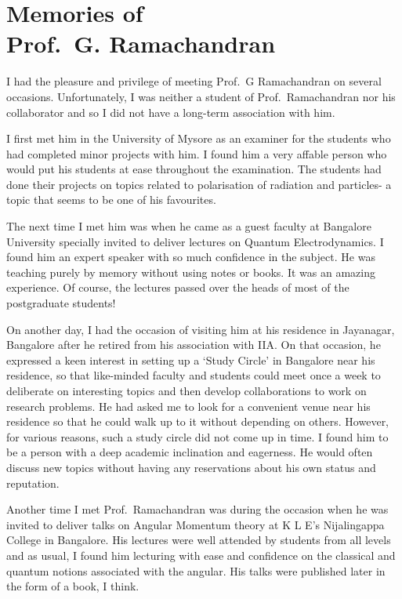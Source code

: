 \chapter[Memories of Prof.\ G. Ramachandran]{Memories of\\ Prof.\ G. Ramachandran}\label{chap21}



I had the pleasure and privilege of meeting Prof.\ G Ramachandran on several occasions. Unfortunately, I was neither a student of Prof.\ Ramachandran nor his collaborator and so I did not have a long-term association with him.


I first met him in the University of Mysore as an examiner for the students who had completed minor projects with him. I found him a very affable person who would put his students at ease throughout the examination. The students had done their projects on topics related to polarisation of radiation and particles- a topic that seems to be one of his favourites.

The next time I met him was when he came as a guest faculty at Bangalore University specially invited to deliver lectures on Quantum Electrodynamics. I found him an expert speaker with so much confidence in the subject. He was teaching purely by memory without using notes or books. It was an amazing experience. Of course, the lectures passed over the heads of most of the postgraduate students!

On another day, I had the occasion of visiting him at his residence in Jayanagar, Bangalore after he retired from his association with IIA. On that occasion, he expressed a keen interest in setting up a `Study Circle' in Bangalore near his residence, so that like-minded faculty and students could meet once a week to deliberate on interesting topics and then develop collaborations to work on research problems. He had asked me to look for a convenient venue near his residence so that he could walk up to it without depending on others. However, for various reasons, such a study circle did not come up in time. I found him to be a person with a deep academic inclination and eagerness. He would often discuss new topics without having any reservations about his own status and reputation.

Another time I met Prof.\ Ramachandran was during the occasion when he was invited to deliver talks on Angular Momentum theory at K L E's Nijalingappa College in Bangalore. His lectures were well attended by students from all levels and as usual, I found him lecturing with ease and confidence on the classical and quantum notions associated with the angular. His talks were published later in the form of a book, I think.

